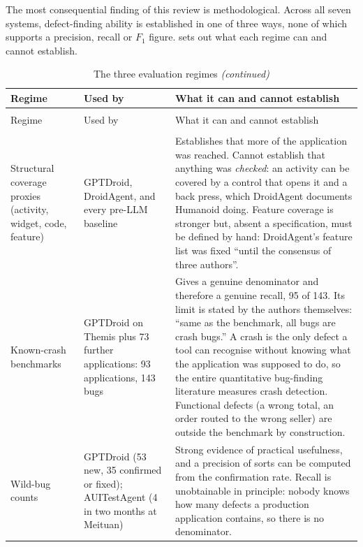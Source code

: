 The most consequential finding of this review is methodological. Across all
seven systems, defect-finding ability is established in one of three ways, none
of which supports a precision, recall or $F_1$ figure.
 sets out what each regime can and cannot establish.

\begingroup
\small
\setlength{\tabcolsep}{5pt}
\begin{xltabular}{\textwidth}{@{}>{\hsize}Y>{\hsize}Y>{\hsize}Y@{}}
  \caption{The three evaluation regimes in the reviewed literature, and the limit of each}
  \label{tab:measurement}\\
  \toprule
  Regime & Used by & What it can and cannot establish \\
  \midrule
  \endfirsthead
  \caption[]{The three evaluation regimes \emph{(continued)}}\\
  \toprule
  Regime & Used by & What it can and cannot establish \\
  \midrule
  \endhead
  \midrule
  \\
  \endfoot
  \bottomrule
  \endlastfoot

  Structural coverage proxies (activity, widget, code, feature) &
    GPTDroid, DroidAgent, and every pre-LLM baseline &
    Establishes that more of the application was reached. Cannot establish that anything was \emph{checked}: an activity can be covered by a control that opens it and a back press, which DroidAgent documents Humanoid doing. Feature coverage is stronger but, absent a specification, must be defined by hand: DroidAgent's feature list was fixed ``until the consensus of three authors''. \\
  \addlinespace
  Known-crash benchmarks &
    GPTDroid on Themis \cite{themis} plus 73 further applications: 93 applications, 143 bugs &
    Gives a genuine denominator and therefore a genuine recall, 95 of 143. Its limit is stated by the authors themselves: ``same as the benchmark, all bugs are crash bugs.'' A crash is the only defect a tool can recognise without knowing what the application was supposed to do, so the entire quantitative bug-finding literature measures crash detection. Functional defects (a wrong total, an order routed to the wrong seller) are outside the benchmark by construction. \\
  \addlinespace
  Wild-bug counts &
    GPTDroid (53 new, 35 confirmed or fixed); AUITestAgent (4 in two months at Meituan) &
    Strong evidence of practical usefulness, and a precision of sorts can be computed from the confirmation rate. Recall is unobtainable in principle: nobody knows how many defects a production application contains, so there is no denominator. \\
\end{xltabular}
\endgroup

